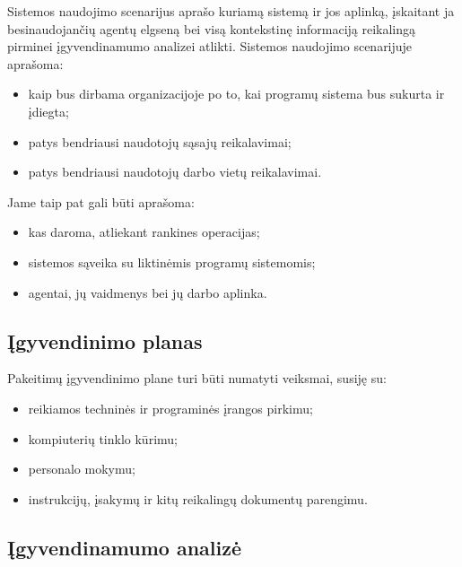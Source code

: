 
Sistemos naudojimo scenarijus aprašo kuriamą sistemą ir jos aplinką, 
įskaitant ja besinaudojančių agentų elgseną bei visą kontekstinę 
informaciją reikalingą pirminei įgyvendinamumo analizei atlikti.
Sistemos naudojimo scenarijuje aprašoma:
\begin{itemize}
  \item kaip bus dirbama organizacijoje po to, kai programų sistema bus
    sukurta ir įdiegta;
  \item patys bendriausi naudotojų sąsajų reikalavimai;
  \item patys bendriausi naudotojų darbo vietų reikalavimai.
\end{itemize}
Jame taip pat gali būti aprašoma:
\begin{itemize}
  \item kas daroma, atliekant rankines operacijas;
  \item sistemos sąveika su liktinėmis  programų sistemomis;
  \item agentai, jų vaidmenys bei jų darbo aplinka.
\end{itemize}

\subsection{Įgyvendinimo planas}


Pakeitimų įgyvendinimo plane turi būti numatyti veiksmai, susiję su:
\begin{itemize}
  \item reikiamos techninės ir programinės įrangos pirkimu;
  \item kompiuterių tinklo kūrimu;
  \item personalo mokymu;
  \item instrukcijų, įsakymų ir kitų reikalingų dokumentų parengimu.
\end{itemize}

\subsection{Įgyvendinamumo analizė}

